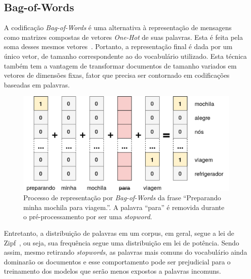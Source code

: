 \subsection{Bag-of-Words}

A codificação \textit{Bag-of-Words} é uma alternativa à representação de
mensagens como matrizes compostas de vetores \textit{One-Hot} de suas palavras.
Esta é feita pela soma desses mesmos vetores~\cite{manning10}.
Portanto, a representação final é dada por um único vetor, de tamanho
correspondente ao do vocabulário utilizado.
Esta técnica também tem a vantagem de transformar documentos de tamanho variados
em vetores de dimensões fixas, fator que precisa ser contornado em codificações
baseadas em palavras.

\begin{figure}[h]
\begin{center} {
    \begin{center}
    \includegraphics[scale=0.30]{images/bag_of_words.png}
    \caption{Processo de representação por \textit{Bag-of-Words} da frase
             ``Preparando minha mochila para viagem.''.
             A palavra ``para'' é removida durante o pré-processamento por
             ser uma \textit{stopword}.}
    \label{fig:bag_of_words}
    \end{center}
}
\end{center}
\end{figure}

Entretanto, a distribuição de palavras em um corpus, em geral, segue a lei de
Zipf~\cite{powers98}, ou seja, sua frequência segue uma distribuição em lei de
potência.
Sendo assim, mesmo retirando \textit{stopwords}, as palavras mais comuns do
vocabulário ainda dominarão os documentos e esse comportamento pode ser
prejudicial para o treinamento dos modelos que serão menos expostos a palavras
incomuns.


